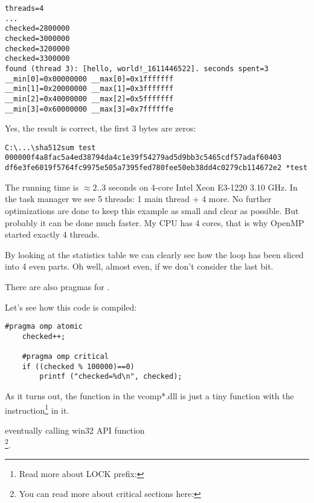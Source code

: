 \begin{lstlisting}
threads=4
...
checked=2800000
checked=3000000
checked=3200000
checked=3300000
found (thread 3): [hello, world!_1611446522]. seconds spent=3
__min[0]=0x00000000 __max[0]=0x1fffffff
__min[1]=0x20000000 __max[1]=0x3fffffff
__min[2]=0x40000000 __max[2]=0x5fffffff
__min[3]=0x60000000 __max[3]=0x7ffffffe
\end{lstlisting}

Yes, the result is correct, the first 3 bytes are zeros:

\begin{lstlisting}
C:\...\sha512sum test
000000f4a8fac5a4ed38794da4c1e39f54279ad5d9bb3c5465cdf57adaf60403
df6e3fe6019f5764fc9975e505a7395fed780fee50eb38dd4c0279cb114672e2 *test
\end{lstlisting}

The running time is $\approx2..3$ seconds on 4-core Intel Xeon E3-1220 3.10 GHz.
In the task manager we see 5 threads: 
1 main thread + 4 more.
No further optimizations are done to keep this example as small and clear as possible.
But probably it can be done much faster.
My \ac{CPU} has 4 cores, that is why OpenMP 
started exactly 4 threads.

By looking at the statistics table we can clearly see how the loop has been sliced into 4 even parts.
Oh well, almost even, if we don't consider the last bit.

There are also pragmas for 
.

Let's see how this code is compiled:

\begin{lstlisting}[style=customc]
	#pragma omp atomic
	checked++;

	#pragma omp critical
	if ((checked % 100000)==0)
		printf ("checked=%d\n", checked);
\end{lstlisting}



As it turns out, the  
function in the vcomp*.dll 
is just a tiny function
with the  instruction\footnote{
Read more about LOCK prefix: } in it.

eventually calling win32 \ac{API} function \\
\footnote{You can read more about critical sections 
here: }.


